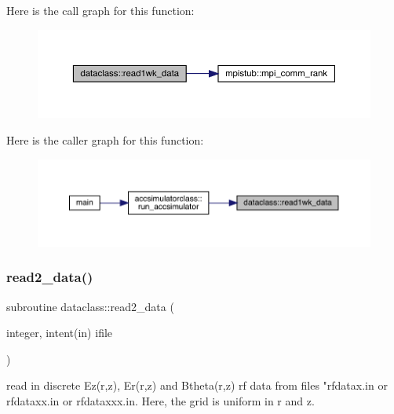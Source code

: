 Here is the call graph for this function\+:\nopagebreak
\begin{figure}[H]
\begin{center}
\leavevmode
\includegraphics[width=350pt]{namespacedataclass_a2fed396f3daf5a5c465b01235d98c776_cgraph}
\end{center}
\end{figure}
Here is the caller graph for this function\+:\nopagebreak
\begin{figure}[H]
\begin{center}
\leavevmode
\includegraphics[width=350pt]{namespacedataclass_a2fed396f3daf5a5c465b01235d98c776_icgraph}
\end{center}
\end{figure}
\mbox{\label{namespacedataclass_abf0c8413e040d7ea8c0bc5df73c9ef96}} 
\subsubsection{\texorpdfstring{read2\_data()}{read2\_data()}}
{\footnotesize\ttfamily subroutine dataclass\+::read2\+\_\+data (\begin{DoxyParamCaption}\item[{integer, intent(in)}]{ifile }\end{DoxyParamCaption})}



read in discrete Ez(r,z), Er(r,z) and Btheta(r,z) rf data from files "rfdatax.\+in or rfdataxx.\+in or rfdataxxx.\+in. Here, the grid is uniform in r and z. 

